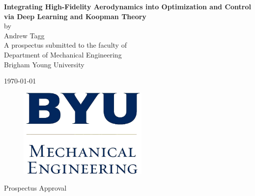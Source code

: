\documentclass[12pt, letterpaper]{article}
\begin{document}
\begin{titlepage}

\begin{center}

\vspace*{\fill}

\vspace{0.5in}
    
{ \LARGE \bfseries Integrating High-Fidelity Aerodynamics into Optimization and Control via Deep Learning and Koopman Theory }\\[.25in]

\large
by\\[.25 in]
Andrew Tagg \\[1in]

A prospectus submitted to the faculty of\\
Department of Mechanical Engineering\\
Brigham Young University

\vspace{1in}

\today

\vspace*{\fill}

\end{center}

\end{titlepage}

\thispagestyle{empty}

\begin{center}
\vspace*{\fill}

\begin{figure}[htbp] %
   \centering
   \includegraphics[width=2.5in]{byume_logo_clear.jpg} 
\end{figure}

\vspace{0.5in}

\Large{Prospectus Approval}\\[0.5in]

\end{center}
\end{document}

